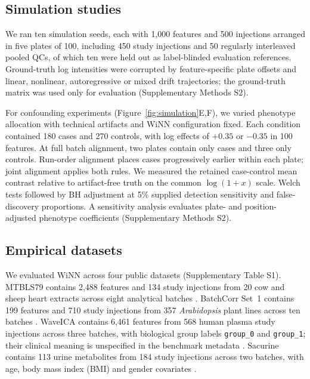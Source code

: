 \documentclass[namedate,webpdf,modern,large,nocrop]{oup-authoring-template}
\begin{document}
\subsection{Simulation studies}

We ran ten simulation seeds, each with 1,000 features and 500 injections arranged in five plates of 100, including 450 study injections and 50 regularly interleaved pooled QCs, of which ten were held out as label-blinded evaluation references. Ground-truth log intensities were corrupted by feature-specific plate offsets and linear, nonlinear, autoregressive or mixed drift trajectories; the ground-truth matrix was used only for evaluation (Supplementary Methods S2).

For confounding experiments (Figure~\ref{fig:simulation}E,F), we varied phenotype allocation with technical artifacts and WiNN configuration fixed. Each condition contained 180 cases and 270 controls, with log effects of $+0.35$ or $-0.35$ in 100 features. At full batch alignment, two plates contain only cases and three only controls. Run-order alignment places cases progressively earlier within each plate; joint alignment applies both rules. We measured the retained case-control mean contrast relative to artifact-free truth on the common $\log(1+x)$ scale. Welch tests followed by BH adjustment at 5\% supplied detection sensitivity and false-discovery proportions. A sensitivity analysis evaluates plate- and position-adjusted phenotype coefficients (Supplementary Methods S2).

\subsection{Empirical datasets}

We evaluated WiNN across four public datasets (Supplementary Table S1). MTBLS79 contains 2,488 features and 134 study injections from 20 cow and sheep heart extracts across eight analytical batches \citep{Kirwan2014DIMSBenchmark}. BatchCorr Set~1 contains 199 features and 710 study injections from 357 \emph{Arabidopsis} plant lines across ten batches \citep{Wehrens2016BatchCorr}. WaveICA contains 6,461 features from 568 human plasma study injections across three batches, with biological group labels \texttt{group\_0} and \texttt{group\_1}; their clinical meaning is unspecified in the benchmark metadata \citep{Deng2021WaveICA}. Sacurine contains 113 urine metabolites from 184 study injections across two batches, with age, body mass index (BMI) and gender covariates \citep{Thevenot2015Sacurine,Thevenot2018W4M00001}.
\end{document}
